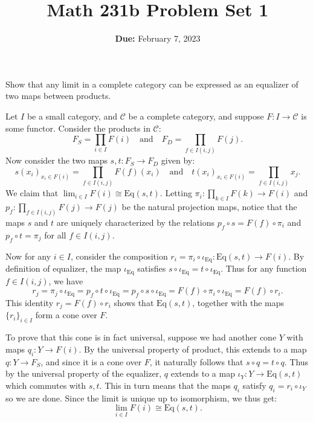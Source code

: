 \documentclass[11pt,letterpaper]{article}
\title{\textbf{Math 231b Problem Set 1}}
\date{\textbf{Due:} February 7, 2023}
\def\CC{\mathcal{C}}
\def\Eq{\mathrm{Eq}}
\begin{document}
\maketitle

\begin{problem}
    Show that any limit in a complete category can be expressed as an equalizer of two maps between products.
\end{problem}

\begin{solution}
    \quad Let $I$ be a small category, and $\CC$ be a complete category, and suppose $F : I \to \CC$ is some functor. Consider the products in $\CC$:
    \[
        F_S = \prod_{i\in I}F(i)\quad\text{and}\quad F_D = \prod_{f \in I(i,j)} F(j)
    .\]
    Now consider the two maps $s, t : F_S \to F_D$ given by:
    \[
        s(x_i)_{x_i\in F(i)} = \prod_{f\in I(i, j)} F(f)(x_i) \quad\text{and}\quad t(x_i)_{x_i\in F(i)} = \prod_{f\in I(i,j)} x_j
    .\] 
    \quad We claim that $\lim_{i\in I} F(i) \cong \Eq(s,t)$. Letting $\pi_i : \prod_{k\in I} F(k) \to F(i)$ and $p_f : \prod_{f\in I(i,j)} F(j) \to F(j)$ be the natural projection maps, notice that the maps $s$ and $t$ are uniquely characterized by the relations $p_f\circ s = F(f)\circ \pi_i$ and $p_f\circ t = \pi_j$ for all $f\in I(i,j)$. 

    \quad Now for any $i\in I$, consider the composition $r_i = \pi_i\circ \iota_\Eq : \Eq(s,t) \to F(i)$. By definition of equalizer, the map $\iota_\Eq$ satisfies $s\circ \iota_\Eq = t\circ \iota_\Eq$. Thus for any function $f \in I(i,j)$, we have \[r_j = \pi_j\circ \iota_\Eq = p_f \circ t \circ \iota_\Eq = p_f\circ s\circ \iota_\Eq = F(f)\circ \pi_i \circ \iota_\Eq = F(f)\circ r_i.\]
    This identity $r_j = F(f)\circ r_i$ shows that $\Eq(s,t)$, together with the maps $\{r_i\}_{i\in I}$ form a cone over $F$. 
    
    \quad To prove that this cone is in fact universal, suppose we had another cone $Y$ with maps $q_i : Y \to F(i)$. By the universal property of product, this extends to a map $q : Y \to F_S$, and since it is a cone over $F$, it naturally follows that $s\circ q = t\circ q$. Thus by the universal property of the equalizer, $q$ extends to a map $\iota_Y : Y \to \Eq(s,t)$ which commutes with $s,t$. This in turn means that the maps $q_i$ satisfy $q_i = r_i\circ \iota_Y$ so we are done. Since the limit is unique up to isomorphism, we thus get:
    \[
        \lim_{i\in I} F(i) \cong \Eq(s,t)
    .\] 
\end{solution}
\end{document}
